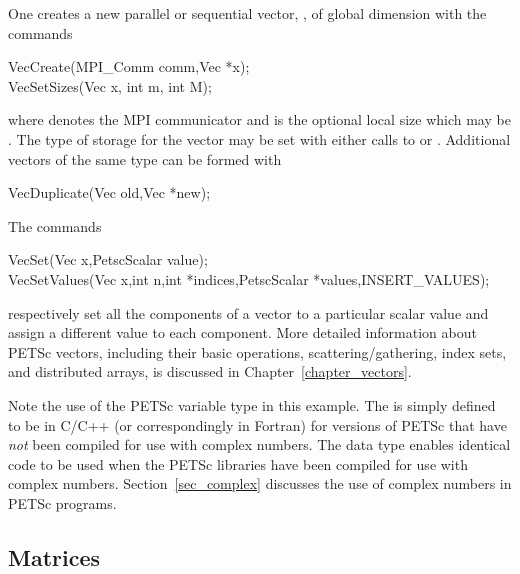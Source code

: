 One creates a new parallel or 
sequential vector, , of global dimension  with the 
commands    
\begin{tabbing}
  VecCreate(MPI\_Comm comm,Vec *x);\\
  VecSetSizes(Vec x, int m, int M);
\end{tabbing}
where  denotes the MPI communicator and  is the optional local size
which may be . The type of storage
for the vector may be set with either calls to 
 or .  
Additional vectors of the same type can be formed with
\begin{tabbing}
  VecDuplicate(Vec old,Vec *new);
\end{tabbing}
The commands  
\begin{tabbing}
  VecSet(Vec x,PetscScalar value);\\
  VecSetValues(Vec x,int n,int *indices,PetscScalar *values,INSERT\_VALUES);
\end{tabbing}
respectively set all the components of a vector to a particular scalar
value and assign a different value to each component.  More
detailed information about PETSc vectors, including their basic
operations, scattering/gathering, index sets, and distributed arrays, is
discussed in Chapter~\ref{chapter_vectors}.

 
Note the use of the PETSc variable type  in this example.
The  is simply defined to be  in C/C++
(or correspondingly   in Fortran) for versions of
PETSc that have {\em not} been compiled for use with complex numbers.
The  data type enables
identical code to be used when the PETSc libraries have been compiled
for use with complex numbers.  Section~\ref{sec_complex} discusses the
use of complex numbers in PETSc programs.

\subsection*{Matrices}
\label{sec_matintro}

